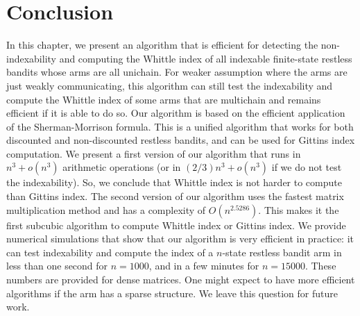 \section{Conclusion}
\label{sec:conclusion}

In this chapter, we present an algorithm that is efficient for detecting the non-indexability and computing the Whittle index of all indexable finite-state restless bandits whose arms are all unichain. For weaker assumption where the arms are just weakly communicating, this algorithm can still test the indexability and compute the Whittle index of some arms that are multichain and remains efficient if it is able to do so.
Our algorithm is based on the efficient application of the Sherman-Morrison formula. This is a unified algorithm that works for both discounted and non-discounted restless bandits, and can be used for Gittins index computation.  We present a first version of our algorithm that runs in $n^3+o(n^3)$ arithmetic operations (or in $(2/3)n^3+o(n^3)$ if we do not test the indexability). So, we conclude that Whittle index is not harder to compute than Gittins index. The second version of our algorithm uses the fastest matrix multiplication method and has a complexity of $O(n^{2.5286})$. This makes it the first subcubic algorithm to compute Whittle index or Gittins index. We provide numerical simulations that show that our algorithm is very efficient in practice: it can test indexability and compute the index of a $n$-state restless bandit arm in less than one second for $n=1000$, and in a few minutes for $n=15000$. These numbers are provided for dense matrices. One might expect to have more efficient algorithms if the arm has a sparse structure. We leave this question for future work. 


